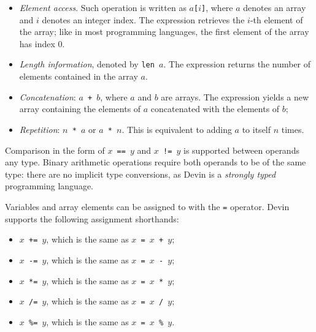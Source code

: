 \documentclass[11pt, american, draft]{PhdThesis}
\begin{document}
  \begin{itemize}[noitemsep,topsep=0pt]
    \item \emph{Element access}. Such operation is written as \mbox{\texttt{$a$[$i$]}}, where $a$
          denotes an array and $i$ denotes an integer index. The expression retrieves the $i$-th
          element of the array; like in most programming languages, the first element of the array
          has index $0$.

    \item \emph{Length information}, denoted by \mbox{\texttt{len $a$}}. The expression returns the
          number of elements contained in the array $a$.
    
    \item \emph{Concatenation}: \mbox{\texttt{$a$ + $b$}}, where $a$ and $b$ are arrays. The
          expression yields a new array containing the elements of $a$ concatenated with the
          elements of $b$;
    
    \item \emph{Repetition}: \mbox{\texttt{$n$ * $a$}} or \mbox{\texttt{$a$ * $n$}}. This is
          equivalent to adding $a$ to itself $n$ times.
  \end{itemize}

  Comparison in the form of \mbox{\texttt{$x$ == $y$}} and \mbox{\texttt{$x$ != $y$}} is supported
  between operands any type. Binary arithmetic operations require both operands to be of the same
  type: there are no implicit type conversions, as Devin is a \emph{strongly typed} programming
  language.

  Variables and array elements can be assigned to with the \verb$=$ operator. Devin supports the
  following assignment shorthands:

  \begin{itemize}[noitemsep,topsep=0pt]
    \item \mbox{\texttt{$x$ += $y$}}, which is the same as \mbox{\texttt{$x$ = $x$ + $y$}};
    \item \mbox{\texttt{$x$ -= $y$}}, which is the same as \mbox{\texttt{$x$ = $x$ - $y$}};
    \item \mbox{\texttt{$x$ *= $y$}}, which is the same as \mbox{\texttt{$x$ = $x$ * $y$}};
    \item \mbox{\texttt{$x$ /= $y$}}, which is the same as \mbox{\texttt{$x$ = $x$ / $y$}};
    \item \mbox{\texttt{$x$ \%= $y$}}, which is the same as \mbox{\texttt{$x$ = $x$ \% $y$}}.
  \end{itemize}
\end{document}
